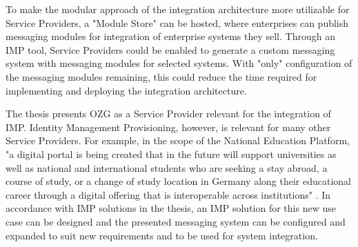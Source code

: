 To make the modular approach of the integration architecture more utilizable for Service Providers, a "Module Store" can be hosted, where enterprises can publish messaging modules for integration of enterprise systems they sell. Through an IMP tool, Service Providers could be enabled to generate a custom messaging system with messaging modules for selected systems. With "only" configuration of the messaging modules remaining, this could reduce the time required for implementing and deploying the integration architecture.

The thesis presents OZG as a Service Provider relevant for the integration of IMP.
Identity Management Provisioning, however, is relevant for many other Service Providers. For example, in the scope of the National Education Platform, "a digital portal is being created that in the future will support universities as well as national and international students who are seeking a stay abroad, a course of study, or a change of study location in Germany along their educational career through a digital offering that is interoperable across institutions" \cite{digitale_bildung}. In accordance with IMP solutions in the thesis, an IMP solution for this new use case can be designed and the presented messaging system can be configured and expanded to suit new requirements and to be used for system integration. 
